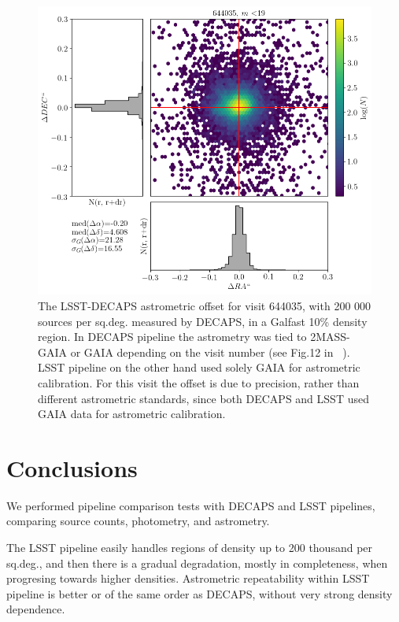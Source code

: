 \documentclass[DM,lsstdraft,toc,usenatbib,authoryear]{lsstdoc}
\begin{document}
\begin{figure}
\begin{centering}
\includegraphics[width=0.8\columnwidth]{figs/lsst_decaps_644035_dra_ddec_m_lt19.png}
\caption{The LSST-DECAPS astrometric offset for visit 644035, with 200 000 sources per sq.deg. measured by DECAPS, in a Galfast 10\% density region. In DECAPS pipeline the astrometry was tied to  2MASS-GAIA or GAIA depending on the visit number (see Fig.12 in ~\cite{schlafly2017}).  LSST pipeline on the other hand used solely GAIA for astrometric calibration. For this visit the offset is due to precision, rather than different astrometric standards, since both DECAPS and LSST used GAIA data for astrometric calibration.}
\label{fig:ra_dec_lsst_decaps}
\end{centering}
\end{figure}




\section{Conclusions}
\label{sec:conclusions}
We performed pipeline comparison tests with DECAPS and LSST pipelines, comparing source counts, photometry, and astrometry.

The LSST pipeline easily handles regions of density up to 200 thousand per sq.deg., and then there is a gradual degradation, mostly in completeness, when progresing towards higher densities. Astrometric repeatability within LSST pipeline is better or of the same order as DECAPS, without very strong density dependence.
\end{document}
